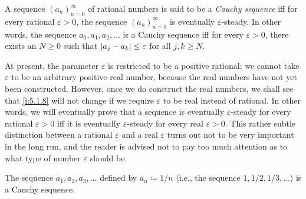 \setcounter{thm}{7}
\begin{defn}\label{i:5.1.8}
  A sequence \((a_n)_{n = 0}^{\infty}\) of rational numbers is said to be a \emph{Cauchy sequence} iff for every rational \(\varepsilon > 0\), the sequence \((a_n)_{n = 0}^{\infty}\) is eventually \(\varepsilon\)-steady.
  In other words, the sequence \(a_0, a_1, a_2, \dots\) is a Cauchy sequence iff for every \(\varepsilon > 0\), there exists an \(N \geq 0\) such that \(\left\lvert a_j - a_k\right\rvert \leq \varepsilon\) for all \(j, k \geq N\).
\end{defn}

\begin{rmk}\label{i:5.1.9}
  At present, the parameter \(\varepsilon\) is restricted to be a positive rational;
  we cannot take \(\varepsilon\) to be an arbitrary positive real number, because the real numbers have not yet been constructed.
  However, once we do construct the real numbers, we shall see that \cref{i:5.1.8} will not change if we require \(\varepsilon\) to be real instead of rational.
  In other words, we will eventually prove that a sequence is eventually \(\varepsilon\)-steady for every rational \(\varepsilon > 0\) iff it is eventually \(\varepsilon\)-steady for every real \(\varepsilon > 0\).
  This rather subtle distinction between a rational \(\varepsilon\) and a real \(\varepsilon\) turns out not to be very important in the long run, and the reader is advised not to pay too much attention as to what type of number \(\varepsilon\) should be.
\end{rmk}

\setcounter{thm}{10}
\begin{prop}\label{i:5.1.11}
  The sequence \(a_1, a_2, a_3, \dots\) defined by \(a_n \coloneqq 1 / n\) (i.e., the sequence \(1, 1 / 2, 1 / 3, \dots\)) is a Cauchy sequence.
\end{prop}

